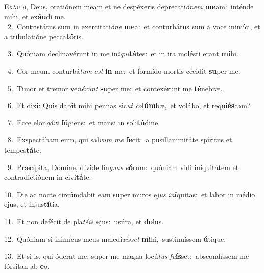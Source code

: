 \lettrine{\initial\textcolor{\initialcolor}{E}}{xáudi,} Deus, oratiónem meam et ne despéxeris deprecati\-\textit{ó}\-\textit{nem} \textbf{me}\-am:~\star inténde mihi, et ex\-\textbf{áu}\-di me.\\
{\numbfont\textcolor{\numbcolor}{~2.}}~Contristátus sum in exercitati\-\textit{ó}\-\textit{ne} \textbf{me}\-a:~\star et conturbátus sum a voce inimíci, et a tribulatióne pecca\-\textbf{tó}\-ris.\par
{\numbfont\textcolor{\numbcolor}{~3.}}~Quóniam declinavérunt in me in\-\textit{i}\-\textit{qui}\textbf{tá}tes:~\star et in ira molésti erant \textbf{mi}\-hi.\par
{\numbfont\textcolor{\numbcolor}{~4.}}~Cor meum conturbá\textit{tum} \textit{est} \textbf{in} me:~\star et formído mortis cécidit \textbf{su}\-per me.\par
{\numbfont\textcolor{\numbcolor}{~5.}}~Timor et tremor ve\-\textit{né}\-\textit{runt} \textbf{su}\-per me:~\star et contexérunt me \textbf{té}\-nebræ.\par
{\numbfont\textcolor{\numbcolor}{~6.}}~Et dixi: Quis dabit mihi pennas sic\textit{ut} \textit{co}\-\textbf{lúm}bæ,~\star et volábo, et requi\-\textbf{és}\-cam?\par
{\numbfont\textcolor{\numbcolor}{~7.}}~Ecce elon\-\textit{gá}\-\textit{vi} \textbf{fú}\-giens:~\star et mansi in soli\-\textbf{tú}\-dine.\par
{\numbfont\textcolor{\numbcolor}{~8.}}~Exspectábam eum, qui sal\textit{vum} \textit{me} \textbf{fe}\-cit:~\star a pusillanimitáte spíritus et tempes\-\textbf{tá}\-te.\par
{\numbfont\textcolor{\numbcolor}{~9.}}~Præcípita, Dómine, dívide lin\textit{guas} \textit{e}\-\textbf{ó}rum:~\star quóniam vidi iniquitátem et contradictiónem in civi\-\textbf{tá}\-te.\par
{\numbfont\textcolor{\numbcolor}{10.}}~Die ac nocte circúmdabit eam super muros e\textit{jus} \textit{in}\-\textbf{í}quitas:~\star et labor in médio ejus, et injus\-\textbf{tí}\-tia.\par
{\numbfont\textcolor{\numbcolor}{11.}}~Et non defécit de pla\-\textit{té}\-\textit{is} \textbf{e}\-jus:~\star usúra, et \textbf{do}\-lus.\par
{\numbfont\textcolor{\numbcolor}{12.}}~Quóniam si inimícus meus maledi\-\textit{xís}\-\textit{set} \textbf{mi}\-hi,~\star sustinuíssem \textbf{ú}\-tique.\par
{\numbfont\textcolor{\numbcolor}{13.}}~Et si is, qui óderat me, super me magna locú\textit{tus} \textit{fu}\-\textbf{ís}set:~\star abscondíssem me fórsitan ab \textbf{e}\-o.\par
